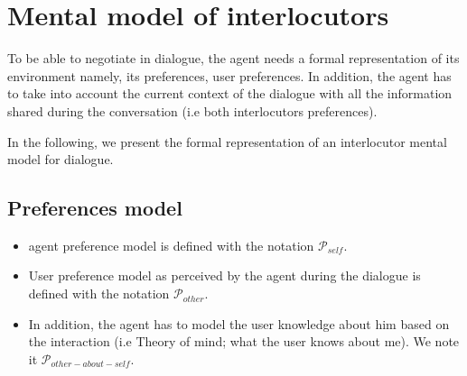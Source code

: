 \documentclass{llncs}
\begin{document}


 \section{Mental model of interlocutors}
 
 
% 
 
% 
 
 
 To be able to negotiate in dialogue, the agent  needs a formal representation of its environment namely, its preferences,  user preferences. In addition, the agent has to take into account the current context of the dialogue with all the information shared during the conversation (i.e both interlocutors preferences). 
 
 In the following, we present the formal representation of an interlocutor mental model for dialogue.  
 
 \subsection{Preferences model}
 
 \begin{itemize}
 	\item agent preference model is defined with the notation $\mathcal{P}_{self}$.
 	\item User preference model as perceived by the agent during the dialogue is  defined with the notation $\mathcal{P}_{other}$.
 	\item In addition, the agent has to model  the user  knowledge about him based on the interaction (i.e Theory of mind; what the user knows about me). We note it   $\mathcal{P}_{other-about-self}$.
 \end{itemize}
\end{document}
